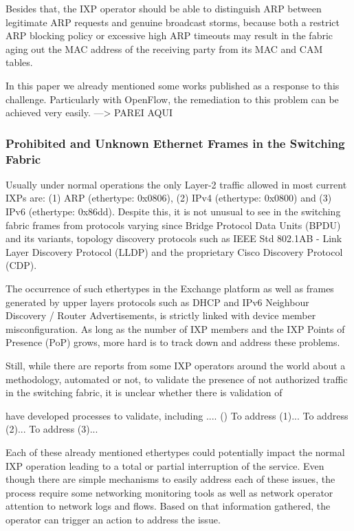 \documentclass[conference]{IEEEtran/IEEEtran}
\begin{document}
Besides that, the IXP operator should be able to distinguish ARP between legitimate ARP requests and genuine broadcast storms, because both a restrict ARP blocking policy or excessive high ARP timeouts may result in the fabric aging out the MAC address of the receiving party from its MAC and CAM tables.

In this paper we already mentioned some works published as a response to this challenge.  Particularly with OpenFlow, the remediation to this problem can be achieved very easily.
---> PAREI AQUI

\subsubsection{Prohibited and Unknown Ethernet Frames in the Switching Fabric}
Usually under normal operations the only Layer-2 traffic allowed in most current IXPs are: (1) ARP (ethertype: 0x0806), (2) IPv4 (ethertype: 0x0800) and (3) IPv6 (ethertype: 0x86dd). Despite this, it is not unusual to see in the switching fabric frames from protocols varying since Bridge Protocol Data Units (BPDU) and its variants, topology discovery protocols such as IEEE Std 802.1AB - Link Layer Discovery Protocol (LLDP) and the proprietary Cisco Discovery Protocol (CDP). 

The occurrence of such ethertypes in the Exchange platform as well as frames generated by upper layers protocols such as DHCP and IPv6 Neighbour Discovery / Router Advertisements, is strictly linked with device member misconfiguration. As long as the number of IXP members and the IXP Points of Presence (PoP) grows, more hard is to track down and address these problems. 

Still, while there are reports from some IXP operators around the world about a methodology, automated or not, to validate the presence of not authorized traffic in the switching fabric, it is unclear whether there is validation of


have developed processes to validate, including .... ()
To address (1)...
To address (2)...
To address (3)...


Each of these already mentioned ethertypes could potentially impact the normal IXP operation leading to a total or partial interruption of the service. Even though there are simple mechanisms to easily address each of these issues, the process require some networking monitoring tools as well as network operator attention to network logs and flows. Based on that information gathered, the operator can trigger an action to address the issue. 
\end{document}
